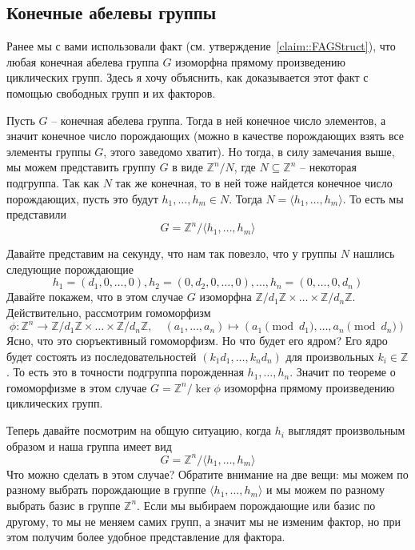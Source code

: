 \subsection{Конечные абелевы группы}

Ранее мы с вами использовали факт (см. утверждение~\ref{claim::FAGStruct}), что любая конечная абелева группа $G$ изоморфна прямому произведению циклических групп.
Здесь я хочу объяснить, как доказывается этот факт с помощью свободных групп и их факторов.

Пусть $G$ -- конечная абелева группа.
Тогда в ней конечное число элементов, а значит конечное число порождающих (можно в качестве порождающих взять все элементы группы $G$, этого заведомо хватит).
Но тогда, в силу замечания выше, мы можем представить группу $G$ в виде $\mathbb Z^n / N$, где $N\subseteq \mathbb Z^n$ -- некоторая подгруппа.
Так как $N$ так же конечная, то в ней тоже найдется конечное число порождающих, пусть это будут $h_1,\ldots,h_m\in N$.
Тогда $N = \langle h_1,\ldots, h_m\rangle$.
То есть мы представили 
\[
G = \mathbb Z^n / \langle h_1,\ldots, h_m \rangle
\]

Давайте представим на секунду, что нам так повезло, что у группы $N$ нашлись следующие порождающие
\[
h_1 = (d_1,0,\ldots, 0), h_2 = (0, d_2,0,\ldots, 0),\ldots, h_n = (0,\ldots,0,d_n)
\]
Давайте покажем, что в этом случае $G$ изоморфна $\mathbb Z/d_1 \mathbb Z \times \ldots \times \mathbb Z/d_n \mathbb Z$.
Действительно, рассмотрим гомоморфизм 
\[
\phi \colon \mathbb Z^n \to \mathbb Z/d_1 \mathbb Z \times \ldots \times \mathbb Z/d_n \mathbb Z,\quad (a_1,\ldots,a_n) \mapsto (a_1 \pmod{d_1},\ldots, a_n \pmod{d_n})
\]
Ясно, что это сюръективный гомоморфизм.
Но что будет его ядром?
Его ядро будет состоять из последовательностей $(k_1 d_1, \ldots, k_n d_n)$ для произвольных $k_i \in \mathbb Z$.
То есть это в точности подгруппа порожденная $h_1,\ldots,h_n$.
Значит по теореме о гомоморфизме в этом случае $G = \mathbb Z^n / \ker \phi$ изоморфна прямому произведению циклических групп.

Теперь давайте посмотрим на общую ситуацию, когда $h_i$ выглядят произвольным образом и наша группа имеет вид
\[
G = \mathbb Z^n / \langle h_1,\ldots, h_m \rangle
\]
Что можно сделать в этом случае?
Обратите внимание на две вещи: мы можем по разному выбрать порождающие в группе $\langle h_1,\ldots, h_m\rangle$ и мы можем по разному выбрать базис в группе $\mathbb Z^n$.
Если мы выбираем порождающие или базис по другому, то мы не меняем самих групп, а значит мы не изменим фактор, но при этом получим более удобное представление для фактора.

